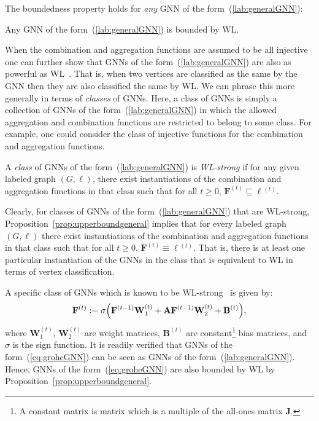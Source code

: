 The boundedness property holds for \textit{any} GNN of the form~(\ref{lab:generalGNN}):
\begin{proposition}\label{prop:upperboundgeneral}
Any GNN of the form~(\ref{lab:generalGNN}) is bounded by WL.
\end{proposition}


When the combination and aggregation functions are assumed to be all injective one can further show that GNNs of the form~(\ref{lab:generalGNN}) are also as powerful as WL~\cite{DBLP:conf/iclr/XuHLJ19}. That is, when two vertices are classified as the same by the GNN then they are also classified the same by WL. 
We can phrase this more generally in terms of \textit{classes} of GNNs. Here, a class of GNNs is simply a collection of GNNs of the form~(\ref{lab:generalGNN}) in which the allowed aggregation and combination functions are restricted to belong to some class. For example, one could consider the class of injective functions for the combination and aggregation functions.

\begin{definition}[WL-strong]\normalfont\label{def:wlstrong}
A \textit{class} of GNNs of the form~(\ref{lab:generalGNN}) is \textit{WL-strong} if for any given labeled graph
	$(G,\pmb{\ell})$, there exist instantiations of the combination and aggregation functions in that class such that for all $t\geq 0$, $\mathbf{F}^{(t)}\sqsubseteq \pmb{\ell}{}^{(t)}$.
\end{definition}

Clearly, for classes of GNNs of the form~(\ref{lab:generalGNN}) that are WL-strong, 
Proposition~\ref{prop:upperboundgeneral} implies that for every labeled graph $(G,\pmb{\ell})$ there
exist instantiations of the combination and aggregation functions in that class such that
for all $t\geq 0$, $\mathbf{F}^{(t)}\equiv \pmb{\ell}{}^{(t)}$. That is, there is at least one particular instantiation of the GNNs in the class that is equivalent to WL in terms of vertex classification.

A specific class of GNNs which is known to be WL-strong~\cite{grohewl} is given by:
\begin{equation}
\mathbf{F}^{(t)}:=\sigma\Bigl(\mathbf{F}^{(t-1)}\mathbf{W}_1^{(t)}+ \mathbf{A}\mathbf{F}^{(t-1)}\mathbf{W}_2^{(t)} + \mathbf{B}^{(t)}\Bigr), \label{eq:groheGNN}
\end{equation}
where $\mathbf{W}_1^{(t)}$, $\mathbf{W}_2^{(t)}$  are weight matrices, $\mathbf{B}^{(t)}$ are 
constant\footnote{A constant matrix is matrix which is a multiple of the all-ones matrix $\mathbf{J}$.} bias matrices, and $\sigma$ is the sign function. It is readily verified that GNNs of the form~(\ref{eq:groheGNN}) can be seen as  GNNs of the form~(\ref{lab:generalGNN}). Hence, GNNs of the form~(\ref{eq:groheGNN}) are also bounded by WL by Proposition~\ref{prop:upperboundgeneral}.

